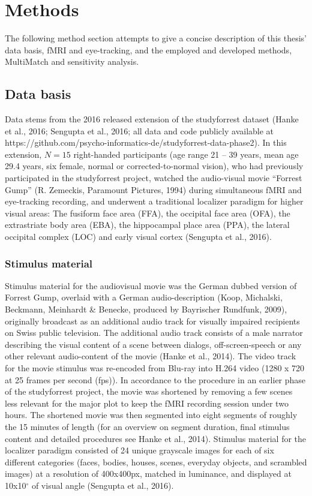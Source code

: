 \documentclass[a4paper, 11pt]{scrreprt}
\begin{document}
\chapter{Methods}\label{par:methods}

The following method section attempts to give a concise description of this thesis' data basis, fMRI and eye-tracking, and the employed and developed methods, MultiMatch and sensitivity analysis. 

\section{Data basis}

Data stems from the 2016 released extension of the studyforrest dataset (Hanke et al., 2016; Sengupta et al., 2016; all data and code publicly available at https://github.com/psycho-informatics-de/studyforrest-data-phase2). In this extension, $N = 15$ right-handed participants (age range 21 – 39 years, mean age 29.4 years, six female, normal or corrected-to-normal vision), who had previously participated in the studyforrest project, watched the audio-visual movie “Forrest Gump” (R. Zemeckis, Paramount Pictures, 1994) during simultaneous fMRI and eye-tracking recording, and underwent a traditional localizer paradigm for higher visual areas: The fusiform face area (FFA), the occipital face area (OFA), the extrastriate body area (EBA), the hippocampal place area (PPA), the lateral occipital complex (LOC) and early visual cortex (Sengupta et al., 2016).

\subsection{Stimulus material}

Stimulus material for the audiovisual movie was the German dubbed version of Forrest Gump, overlaid with a German audio-description (Koop, Michalski, Beckmann, Meinhardt \& Benecke, produced by Bayrischer Rundfunk, 2009), originally broadcast as an additional audio track for visually impaired recipients on Swiss public television. The additional audio track consists of a male narrator describing the visual content of a scene between dialogs, off-screen-speech or any other relevant audio-content of the movie (Hanke et al., 2014). The video track for the movie stimulus was re-encoded from Blu-ray into H.264 video (1280 x 720 at 25 frames per second (fps)). In accordance to the procedure in an earlier phase of the studyforrest project, the movie was shortened by removing a few scenes less relevant for the major plot to keep the fMRI recording session under two hours. The shortened movie was then segmented into eight segments of roughly the 15 minutes of length (for an overview on segment duration, final stimulus content and detailed procedures see Hanke et al., 2014). Stimulus material for the localizer paradigm consisted of 24 unique grayscale images for each of six different categories (faces, bodies, houses, scenes, everyday objects, and scrambled images) at a resolution of 400x400px, matched in luminance, and displayed at 10x10$^\circ$ of visual angle (Sengupta et al., 2016).
\end{document}
